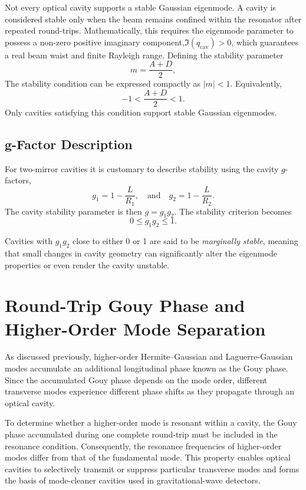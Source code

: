 \documentclass{report}
\begin{document}
Not every optical cavity supports a stable Gaussian eigenmode. A cavity is considered stable only when the beam remains confined within the resonator after repeated round-trips. Mathematically, this requires the eigenmode parameter to possess a non-zero positive imaginary component,$\Im(q_{\mathrm{cav}}) > 0$, which guarantees a real beam waist and finite Rayleigh range. Defining the stability parameter
\begin{equation}
m=\frac{A+D}{2},
\end{equation}
The stability condition can be expressed compactly as $|m|<1$. Equivalently,
\begin{equation}
-1 < \frac{A+D}{2} < 1.
\end{equation}
Only cavities satisfying this condition support stable Gaussian eigenmodes.

\subsection{g-Factor Description}

For two-mirror cavities it is customary to describe stability using the cavity $g$-factors,
\begin{equation}
g_1 = 1-\frac{L}{R_1},
\quad
\text{and}
\quad
g_2 = 1-\frac{L}{R_2}.
\end{equation}
The cavity stability parameter is then $g=g_1g_2$. The stability criterion becomes
\begin{equation}
0 \leq g_1g_2 \leq 1.
\end{equation}

Cavities with $g_1g_2$ close to either 0 or 1 are said to be \textit{marginally stable}, meaning that small changes in cavity geometry can significantly alter the eigenmode properties or even render the cavity unstable.

\section{Round-Trip Gouy Phase and Higher-Order Mode Separation}

As discussed previously, higher-order Hermite--Gaussian and Laguerre-Gaussian modes accumulate an additional longitudinal phase known as the Gouy phase. Since the accumulated Gouy phase depends on the mode order, different transverse modes experience different phase shifts as they propagate through an optical cavity.

To determine whether a higher-order mode is resonant within a cavity, the Gouy phase accumulated during one complete round-trip must be included in the resonance condition. Consequently, the resonance frequencies of higher-order modes differ from that of the fundamental mode. This property enables optical cavities to selectively transmit or suppress particular transverse modes and forms the basis of mode-cleaner cavities used in gravitational-wave detectors.
\end{document}
